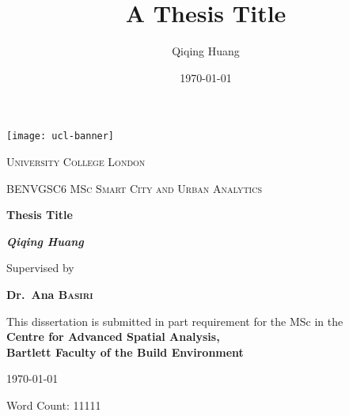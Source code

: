 \documentclass[11pt,a4paper ,twoside ,openany]{book}
\begin{document}
\title{A Thesis Title}
\author{Qiqing Huang}
\date{\today}
\begin{titlepage}
    \centering
    \vspace*{-6.55\baselineskip}
    \hspace*{-0.27\textwidth}
    \texttt{[image: ucl-banner]}
    \par\vspace*{5\baselineskip}
    {\scshape\LARGE University College London \par}
	\vspace{0.5cm}
	{\scshape\large BENVGSC6 MSc Smart City and Urban Analytics\par}
	\vspace{3cm}
	{\huge\bfseries Thesis Title\par}
	\vspace{3cm}
	{\Large\bfseries\itshape Qiqing Huang\par}
	\vspace{3cm}
	{Supervised by\par}
    {\bfseries Dr.~Ana \textsc{Basiri}\par}
    \vspace{0.5cm}
    {This dissertation is
    submitted in part requirement for the MSc 
    in the \\
    \bfseries{Centre for Advanced
    Spatial Analysis}, \\
    \bfseries{Bartlett Faculty of the
    Build Environment}\par}
	\vfill
    {\today\par}
    {Word Count: 11111\par}
\end{titlepage}

\frontmatter


\tableofcontents
\listoffigures
\listoftables


\mainmatter




 

\backmatter
\clearpage
\newpage

\end{document}
